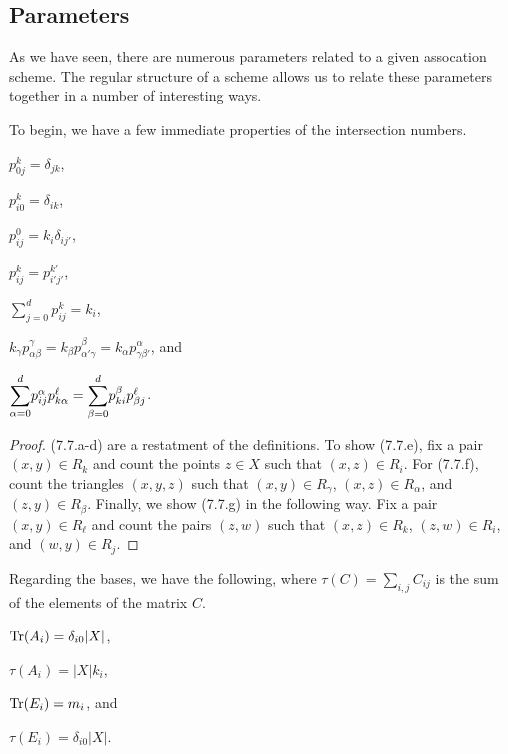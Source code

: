 \documentclass[../../../main]{subfiles}
\begin{document}
 \dinkus
 
 \subsection{Parameters}
 
 As we have seen, there are numerous parameters related to a given assocation scheme. The regular structure of a scheme allows us to relate these parameters together in a number of interesting ways.
 
 To begin, we have a few immediate properties of the intersection numbers.
 
 \begin{prop}
  \begin{defenum}
   \item[]
   \item $p_{0j}^k=\delta_{jk}$,
   \item $p_{i0}^k=\delta_{ik}$,
   \item $p_{ij}^0=k_i\delta_{ij'}$,
   \item $p_{ij}^k=p_{i'j'}^{k'}$,
   \item $\sum_{j=0}^d p_{ij}^k=k_i$,
   \item $k_\gamma p_{\alpha\beta}^\gamma=k_\beta p_{\alpha'\gamma}^\beta=k_\alpha p_{\gamma\beta'}^\alpha$, and
   \item $\ssum_{\alpha=0}^d p_{ij}^\alpha p_{k\alpha}^\ell=\ssum_{\beta=0}^d p_{ki}^\beta p_{\beta j}^\ell$.
  \end{defenum}
 \end{prop}
 
 \begin{proof}
  (7.7.a-d) are a restatment of the definitions. To show (7.7.e), fix a pair $(x,y) \in R_k$ and count the points $z \in X$ such that $(x,z) \in R_i$. For (7.7.f), count the triangles $(x,y,z)$ such that $(x,y) \in R_\gamma$, $(x,z) \in R_\alpha$, and $(z,y) \in R_\beta$. Finally, we show (7.7.g) in the following way. Fix a pair $(x,y) \in R_\ell$ and count the pairs $(z,w)$ such that $(x,z) \in R_k$, $(z,w) \in R_i$, and $(w,y) \in R_j$.
 \end{proof}
 
 Regarding the bases, we have the following, where $\tau(C)=\sum_{i,j}C_{ij}$ is the sum of the elements of the matrix $C$.
 
 \begin{prop}
  \begin{defenum}
   \item[]
   \item $\text{Tr}(A_i)=\delta_{i0}|X|$,
   \item $\tau(A_i)=|X|k_i$,
   \item $\text{Tr}(E_i)=m_i$, and
   \item $\tau(E_i)=\delta_{i0}|X|$.
  \end{defenum}
 \end{prop}
 
\end{document}

